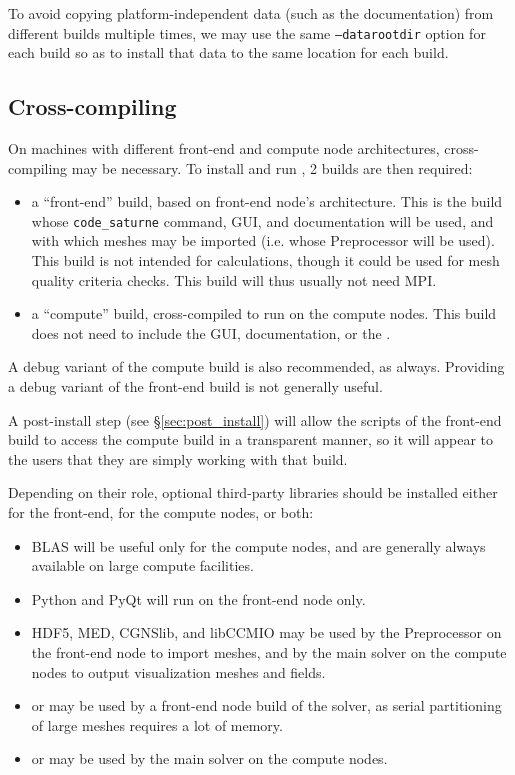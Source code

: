\documentclass[a4paper,10pt,twoside]{csshortdoc}
\begin{document}
To avoid copying platform-independent data (such as the documentation)
from different builds multiple times, we may use the same
\texttt{--datarootdir} option for each build so as to install that
data to the same location for each build.

\subsection{Cross-compiling}

On machines with different front-end and compute node architectures,
cross-compiling may be necessary.
To install and run \CS, 2 builds are then required:

\begin{itemize}
\item a ``front-end'' build, based on front-end node's architecture. This is
      the build whose \texttt{code\_saturne} command, GUI, and documentation
      will be used, and with which meshes may be imported (i.e. whose
      Preprocessor will be used). This build is not intended for calculations,
      though it could be used for mesh quality criteria checks.
      This build will thus usually not need  MPI.
\item a ``compute'' build, cross-compiled to run on the compute nodes.
      This build does not need to include the GUI, documentation, or
      the \pcs.
\end{itemize}

A debug variant of the compute build is also recommended, as always.
Providing a debug variant of the front-end build is not generally useful.

A post-install step (see \S\ref{sec:post_install}) will allow
the scripts of the front-end build to access the compute build in a transparent
manner, so it will appear to the users that they are simply working with that
build.

Depending on their role, optional third-party libraries should be installed
either for the front-end, for the compute nodes, or both:

\begin{itemize}
\item BLAS will be useful only for the compute nodes, and are generally
      always available on large compute facilities.
\item Python and PyQt will run on the front-end node only.
\item HDF5, MED, CGNSlib, and libCCMIO may be used by the Preprocessor on
      the front-end node to import meshes, and by the main solver on the
      compute nodes to output visualization meshes and fields.
\item \scotch or \metis may be used by a front-end node build of the
      solver, as serial partitioning of large meshes requires a lot of memory.
\item \ptscotch or \parmetis may be used by the main solver on the
      compute nodes.
\end{itemize}
\end{document}

